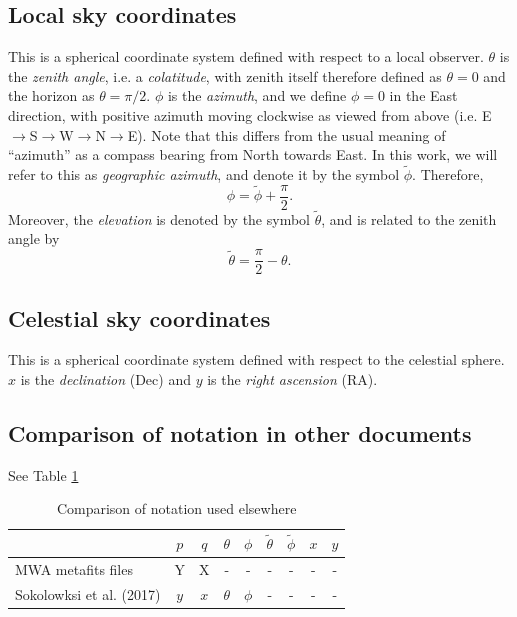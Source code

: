 \documentclass{book}
\begin{document}
\subsection{Local sky coordinates}
\label{sec:coordslocalsky}

This is a spherical coordinate system defined with respect to a local observer.
$\theta$ is the \textit{zenith angle}, i.e. a \textit{colatitude}, with zenith itself therefore defined as $\theta = 0$ and the horizon as $\theta = \pi/2$.
$\phi$ is the \textit{azimuth}, and we define $\phi = 0$ in the East direction, with positive azimuth moving clockwise as viewed from above (i.e. E$\rightarrow$S$\rightarrow$W$\rightarrow$N$\rightarrow$E).
Note that this differs from the usual meaning of ``azimuth'' as a compass bearing from North towards East.
In this work, we will refer to this as \textit{geographic azimuth}, and denote it by the symbol $\tilde{\phi}$.
Therefore,
\begin{equation}
    \phi = \tilde{\phi} + \frac{\pi}{2}.
\end{equation}
Moreover, the \textit{elevation} is denoted by the symbol $\tilde{\theta}$, and is related to the zenith angle by
\begin{equation}
    \tilde{\theta} = \frac{\pi}{2} - \theta.
\end{equation}

\subsection{Celestial sky coordinates}

This is a spherical coordinate system defined with respect to the celestial sphere.
$x$ is the \textit{declination} (Dec) and $y$ is the \textit{right ascension} (RA).

\subsection{Comparison of notation in other documents}

See Table \ref{tbl:notations}
\begin{table}[!hb]
    \centering
    \caption{Comparison of notation used elsewhere}
    \label{tbl:notations}
    \begin{tabular}{l|cc|cc|cc|cc}
        & $p$ & $q$ & $\theta$ & $\phi$ & $\tilde{\theta}$ & $\tilde{\phi}$ & $x$ & $y$ \\
        \hline
        MWA metafits files       & Y & X & - & - & - & - & - & - \\
        Sokolowksi et al. (2017) & $y$ & $x$ & $\theta$ & $\phi$ & - & - & - & - \\
    \end{tabular}
\end{table}
\end{document}
